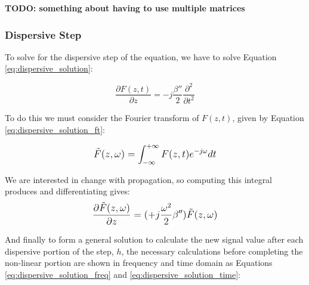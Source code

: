 \documentclass[colorlinks,11pt,a4paper,normalphoto,withhyper,ragged2e]{altareport}
\begin{document}
			
			\begin{figure}[h]
				\centering
				\scalebox{0.85}{}
				\caption{}
				\label{fig:envelope_continuous_discrete}
			\end{figure}	
			
			\textbf{TODO: something about having to use multiple matrices}
			
			
			\pagebreak
			
			
		\subsubsection{Dispersive Step}
			To solve for the dispersive step of the equation, we have to solve Equation \ref{eq:dispersive_solution}: 
			
			\begin{equation} \label{eq:dispersive_solution}
				\frac{\partial F(z, t)}{\partial z} = - j \frac{ \beta ''}{2} \frac{\partial^2}{\partial t^2}
			\end{equation}
			
			\vspace{5mm}
			
			To do this we must consider the Fourier transform of $F(z, t)$, given by Equation \ref{eq:dispersive_solution_ft}:
			
			\begin{equation} \label{eq:dispersive_solution_ft}
				\mathlarger{\tilde{F}(z, \omega) = \int_{-\infty}^{+\infty} F(z, t) e^{-j \omega} dt}
			\end{equation}
			
			
			\vspace{5mm}
			
			
			We are interested in change with propagation, so computing this integral produces and differentiating gives:
			\begin{equation}
				\mathlarger{\frac{\partial \tilde{F}(z, \omega)}{\partial z} = (+ j \frac{\omega^2}{2} \beta '') \tilde{F}(z, \omega)} \nonumber
			\end{equation}
			
			\vspace{5mm}
			
			And finally to form a general solution to calculate the new signal value after each dispersive portion of the step, $h$, the necessary calculations before completing the non-linear portion are shown in frequency and time domain as Equations \ref{eq:dispersive_solution_freq} and \ref{eq:dispersive_solution_time}:
			
\end{document}
